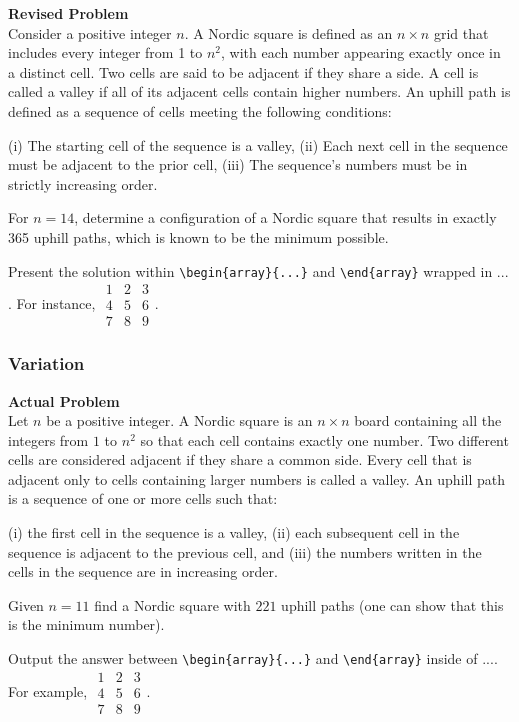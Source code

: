\textbf{Revised Problem}\\
Consider a positive integer \( n \). A Nordic square is defined as an \( n \times n \) grid that includes every integer from 1 to \( n^2 \), with each number appearing exactly once in a distinct cell. Two cells are said to be adjacent if they share a side. A cell is called a valley if all of its adjacent cells contain higher numbers. An uphill path is defined as a sequence of cells meeting the following conditions:

(i) The starting cell of the sequence is a valley,
(ii) Each next cell in the sequence must be adjacent to the prior cell,
(iii) The sequence's numbers must be in strictly increasing order.

For \( n = 14 \), determine a configuration of a Nordic square that results in exactly 365 uphill paths, which is known to be the minimum possible.

Present the solution within \verb|\begin{array}{...}| and \verb|\end{array}| wrapped in $\boxed{...}$. For instance, $\boxed{\begin{array}{ccc}1 & 2 & 3 \\ 4 & 5 & 6 \\ 7 & 8 & 9\end{array}}$.

\subsubsection{Variation}
\textbf{Actual Problem}\\
Let $n$ be a positive integer. A Nordic square is an $n \times n$ board containing all the integers from $1$ to $n^2$ so that each cell contains exactly one number. Two different cells are considered adjacent if they share a common side. Every cell that is adjacent only to cells containing larger numbers is called a valley. An uphill path is a sequence of one or more cells such that:

(i) the first cell in the sequence is a valley,
(ii) each subsequent cell in the sequence is adjacent to the previous cell, and
(iii) the numbers written in the cells in the sequence are in increasing order.

Given $n = 11$ find a Nordic square with $221$ uphill paths (one can show that this is the minimum number).


Output the answer between \verb|\begin{array}{...}| and \verb|\end{array}| inside of $\boxed{...}$. For example, $\boxed{\begin{array}{ccc}1 & 2 & 3 \\ 4 & 5 & 6 \\ 7 & 8 & 9\end{array}}$.

